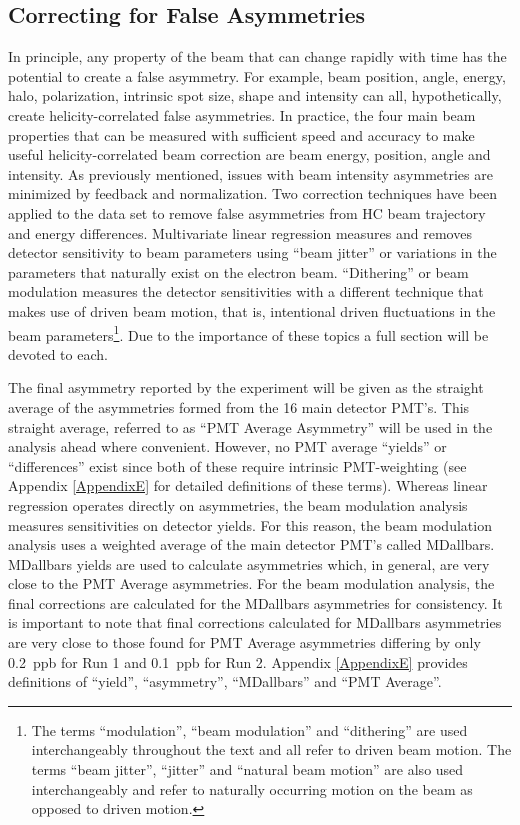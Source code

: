 \subsection{Correcting for False Asymmetries}   
In principle, any property of the beam that can change rapidly with time has the potential to create a false asymmetry. For example, beam position, angle, energy, halo, polarization, intrinsic spot size, shape and intensity can all, hypothetically, create helicity-correlated false asymmetries. In practice, the four main beam properties that can be measured with sufficient speed and accuracy to make useful helicity-correlated beam correction are beam energy, position, angle and intensity. As previously mentioned, issues with beam intensity asymmetries are minimized by feedback and normalization. Two correction techniques have been applied to the \Qs data set to remove false asymmetries from HC beam trajectory and energy differences. Multivariate linear regression measures and removes detector sensitivity to beam parameters using ``beam jitter'' or variations in the parameters that naturally exist on the electron beam. ``Dithering'' or beam modulation measures the detector sensitivities with a different technique that makes use of driven beam motion, that is, intentional driven fluctuations in the beam parameters\footnote{The terms ``modulation'', ``beam modulation'' and ``dithering'' are used interchangeably throughout the text and all refer to driven beam motion. The terms ``beam jitter'', ``jitter'' and ``natural beam motion'' are also used interchangeably and refer to naturally occurring motion on the beam as opposed to driven motion.}. Due to the importance of these topics a full section will be devoted to each.

The final asymmetry reported by the \Qs experiment will be given as the straight average of the asymmetries formed from the 16 main detector PMT's. This straight average, referred to as ``PMT Average Asymmetry'' will be used in the analysis ahead where convenient. However, no PMT average ``yields'' or ``differences'' exist since both of these require intrinsic PMT-weighting (see Appendix \ref{AppendixE} for detailed definitions of these terms). Whereas linear regression operates directly on asymmetries, the beam modulation analysis measures sensitivities on detector yields. For this reason, the beam modulation analysis uses a weighted average of the main detector PMT's called MDallbars. MDallbars yields are used to calculate asymmetries which, in general, are very close to the PMT Average asymmetries. For the beam modulation analysis, the final corrections are calculated for the MDallbars asymmetries for consistency. It is important to note that final corrections calculated for MDallbars asymmetries are very close to those found for PMT Average asymmetries differing by only 0.2~ppb for Run 1 and 0.1~ppb for Run 2.  Appendix \ref{AppendixE} provides definitions of ``yield'', ``asymmetry'', ``MDallbars'' and ``PMT Average''.

